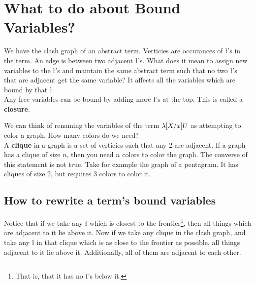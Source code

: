 
\section{What to do about Bound Variables?}
We have the clash graph of an abstract term. Verticies are occurances of \l's in the term. An edge is between two adjacent \l's. What does it mean to assign new variables to the \l's and maintain the same abstract term such that no two \l's that are adjacent get the same variable? It affects all the variables which are bound by that \l.\\

Any free variables can be bound by adding more \l's at the top. This is called a \textbf{closure}.\\

We can think of renaming the variables of the term $\lambda [X / x]U$ as attempting to color a graph. How many colors do we need?\\

A \textbf{clique} in a graph is a set of verticies such that any 2 are adjacent.
If a graph has a clique of size $n$, then you need $n$ colors to color the graph. The converse of this statement is not true. Take for example the graph of a pentagram. It has cliques of size 2, but requires 3 colors to color it.\\%

\subsection{How to rewrite a term's bound variables}
Notice that if we take any \l{} which is closest to the frontier\footnote{That is, that it has no \l's below it.}, then all things which are adjacent to it lie above it. Now if we take any clique in the clash graph, and take any \l{} in that clique which is as close to the frontier as possible, all things adjacent to it lie above it. Additionally, all of them are adjacent to each other.\\

